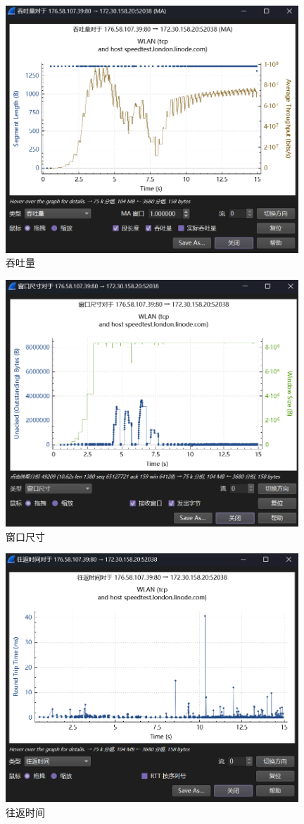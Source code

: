\documentclass{article}
\begin{document}
	\begin{figure}[H]
		\centering
		\includegraphics[width=11cm]{images/27.吞吐量.png}
		\caption{吞吐量}
	\end{figure}
	
	\begin{figure}[H]
	\centering
	\includegraphics[width=11cm]{images/28.窗口尺寸.png}
	\caption{窗口尺寸}
	\end{figure}
	
	\begin{figure}[H]
	\centering
	\includegraphics[width=11cm]{images/29.往返时间.png}
	\caption{往返时间}
	\end{figure}
	
\end{document}
